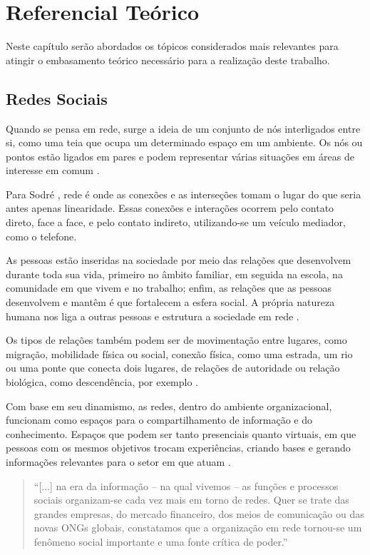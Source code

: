 \chapter{Referencial Teórico}

Neste capítulo serão abordados os tópicos considerados mais relevantes para atingir o embasamento teórico necessário para a realização deste trabalho.

\section{Redes Sociais}

Quando se pensa em rede, surge a ideia de um conjunto de nós interligados entre si, como uma teia que ocupa um determinado espaço em um ambiente. Os nós ou pontos estão ligados em pares e podem representar várias situações em áreas de interesse em comum \cite{Newman:2010}.

Para Sodré \cite{Sodre:2002}, rede é onde as conexões e as interseções tomam o lugar do que seria antes apenas linearidade. Essas conexões e interações ocorrem pelo contato direto, face a face, e pelo contato indireto, utilizando-se um veículo mediador, como o telefone.

As pessoas estão inseridas na sociedade por meio das relações que desenvolvem durante toda sua vida, primeiro no âmbito familiar, em seguida na escola, na comunidade em que vivem e no trabalho; enfim, as relações que as pessoas desenvolvem e mantêm é que fortalecem a esfera social. A própria natureza humana nos liga a outras pessoas e estrutura a sociedade em rede \cite{Tomae:Alcara:Chiara:2005}.

Os tipos de relações também podem ser de movimentação entre lugares, como migração, mobilidade física ou social, conexão física, como uma estrada, um rio ou uma ponte que conecta dois lugares, de relações de autoridade ou relação biológica, como descendência, por exemplo \cite{Wasserman:1994}.

Com base em seu dinamismo, as redes, dentro do ambiente organizacional, funcionam como espaços para o compartilhamento de informação e do conhecimento. Espaços que podem ser tanto presenciais quanto virtuais, em que pessoas com os mesmos objetivos trocam experiências, criando bases e gerando informações relevantes para o setor em que atuam \cite{Tomae:Alcara:Chiara:2005}.

\begin{quote}
	``[...] na era da informação – na qual vivemos – as
	funções e processos sociais organizam-se cada vez
	mais em torno de redes. Quer se trate das grandes
	empresas, do mercado financeiro, dos meios de
	comunicação ou das novas ONGs globais,
	constatamos que a organização em rede tornou-se
	um fenômeno social importante e uma fonte crítica
	de poder.'' \cite{Capra:2002}
\end{quote}

